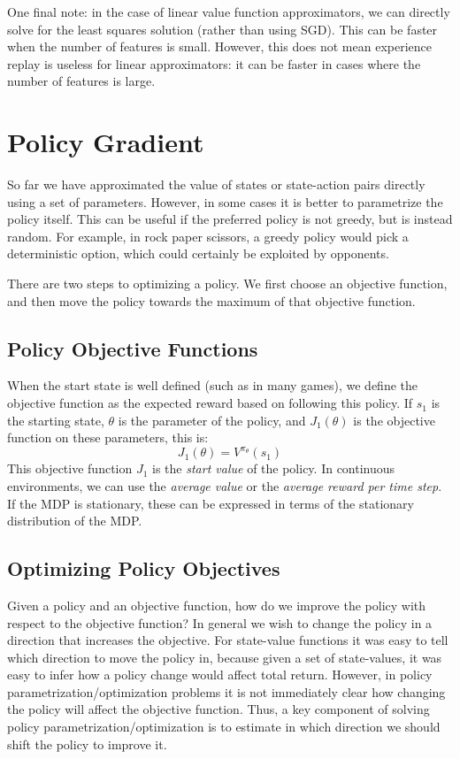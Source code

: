 \documentclass{article}
\newcommand{\ita}{\textit}
\begin{document}
One final note: in the case of linear value function approximators, we can directly solve for the least squares solution (rather than using SGD). This can be faster when the number of features is small. However, this does not mean experience replay is useless for linear approximators: it can be faster in cases where the number of features is large.

\section{Policy Gradient}

So far we have approximated the value of states or state-action pairs directly using a set of parameters. However, in some cases it is better to parametrize the policy itself. This can be useful if the preferred policy is not greedy, but is instead random. For example, in rock paper scissors, a greedy policy would pick a deterministic option, which could certainly be exploited by opponents.

There are two steps to optimizing a policy. We first choose an objective function, and then move the policy towards the maximum of that objective function.

\subsection{Policy Objective Functions}

When the start state is well defined (such as in many games), we define the objective function as the expected reward based on following this policy. If $s_1$ is the starting state, $\theta$ is the parameter of the policy, and $J_1(\theta)$ is the objective function on these parameters, this is:
$$J_1(\theta) = V^{\pi_\theta}(s_1)$$
This objective function $J_1$ is the \ita{start value} of the policy. In continuous environments, we can use the \ita{average value} or the \ita{average reward per time step}. If the MDP is stationary, these can be expressed in terms of the stationary distribution of the MDP.

\subsection{Optimizing Policy Objectives}

Given a policy and an objective function, how do we improve the policy with respect to the objective function? In general we wish to change the policy in a direction that increases the objective. For state-value functions it was easy to tell which direction to move the policy in, because given a set of state-values, it was easy to infer how a policy change would affect total return. However, in policy parametrization/optimization problems it is not immediately clear how changing the policy will affect the objective function. Thus, a key component of solving policy parametrization/optimization is to estimate in which direction we should shift the policy to improve it.
\end{document}
